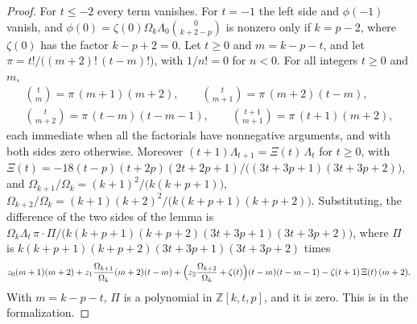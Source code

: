 \documentclass[11pt]{amsart}
\theoremstyle{definition}
\numberwithin{equation}{section}
\newcommand{\Z}{\mathbb{Z}}
\begin{document}
\begin{proof}
For $t\le-2$ every term vanishes. For $t=-1$ the left side and $\phi(-1)$ vanish, and $\phi(0)=\zeta(0)\Omega_k\Lambda_0\binom{0}{k+2-p}$ is nonzero only if $k=p-2$, where $\zeta(0)$ has the factor $k-p+2=0$. Let $t\ge0$ and $m=k-p-t$, and let $\pi=t!/\bigl((m+2)!\,(t-m)!\bigr)$, with $1/n!=0$ for $n<0$. For all integers $t\ge0$ and $m$,
\begin{gather*}
\binom tm=\pi\,(m+1)(m+2),\qquad \binom t{m+1}=\pi\,(m+2)(t-m),\\
\binom t{m+2}=\pi\,(t-m)(t-m-1),\qquad \binom{t+1}{m+1}=\pi\,(t+1)(m+2),
\end{gather*}
each immediate when all the factorials have nonnegative arguments, and with both sides zero otherwise. Moreover $(t+1)\Lambda_{t+1}=\Xi(t)\,\Lambda_t$ for $t\ge0$, with $\Xi(t)=-18(t-p)(t+2p)(2t+2p+1)/\bigl((3t+3p+1)(3t+3p+2)\bigr)$, and $\Omega_{k+1}/\Omega_k=(k+1)^2/\bigl(k(k+p+1)\bigr)$, $\Omega_{k+2}/\Omega_k=(k+1)(k+2)^2/\bigl(k(k+p+1)(k+p+2)\bigr)$. Substituting, the difference of the two sides of the lemma is $\Omega_k\Lambda_t\,\pi\cdot\Pi/\bigl(k(k+p+1)(k+p+2)(3t+3p+1)(3t+3p+2)\bigr)$, where $\Pi$ is $k(k+p+1)(k+p+2)(3t+3p+1)(3t+3p+2)$ times
\[
z_0(m+1)(m+2)+z_1\frac{\Omega_{k+1}}{\Omega_k}(m+2)(t-m)+\Bigl(z_2\frac{\Omega_{k+2}}{\Omega_k}+\zeta(t)\Bigr)(t-m)(t-m-1)-\zeta(t+1)\,\Xi(t)\,(m+2).
\]
With $m=k-p-t$, $\Pi$ is a polynomial in $\Z[k,t,p]$, and it is zero. This is  in the formalization.
\end{proof}
\end{document}
